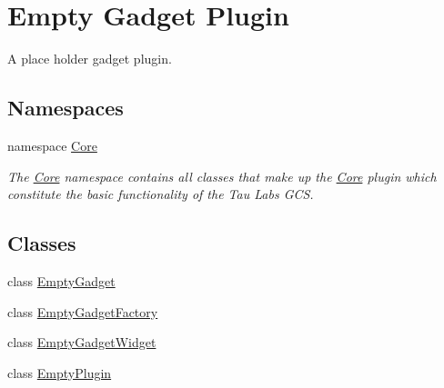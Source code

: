\hypertarget{group___empty_gadget_plugin}{\section{Empty Gadget Plugin}
\label{group___empty_gadget_plugin}
}


A place holder gadget plugin.  


\subsection*{Namespaces}
\begin{DoxyCompactItemize}
\item 
namespace \hyperlink{namespace_core}{Core}
\begin{DoxyCompactList}\small\item\em The \hyperlink{namespace_core}{Core} namespace contains all classes that make up the \hyperlink{namespace_core}{Core} plugin which constitute the basic functionality of the Tau Labs G\-C\-S. \end{DoxyCompactList}\end{DoxyCompactItemize}
\subsection*{Classes}
\begin{DoxyCompactItemize}
\item 
class \hyperlink{class_empty_gadget}{Empty\-Gadget}
\item 
class \hyperlink{class_empty_gadget_factory}{Empty\-Gadget\-Factory}
\item 
class \hyperlink{class_empty_gadget_widget}{Empty\-Gadget\-Widget}
\item 
class \hyperlink{class_empty_plugin}{Empty\-Plugin}
\end{DoxyCompactItemize}
